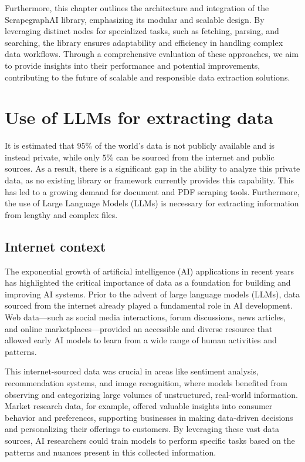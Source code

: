 Furthermore, this chapter outlines the architecture and integration of the ScrapegraphAI library, emphasizing its modular and scalable design. By leveraging distinct nodes for specialized tasks, such as fetching, parsing, and searching, the library ensures adaptability and efficiency in handling complex data workflows. Through a comprehensive evaluation of these approaches, we aim to provide insights into their performance and potential improvements, contributing to the future of scalable and responsible data extraction solutions.
\section{Use of LLMs for extracting data}
It is estimated that $95\%$ of the world's data is not publicly available and is instead private, while only $5\%$ can be sourced from the internet and public sources. As a result, there is a significant gap in the ability to analyze this private data, as no existing library or framework currently provides this capability. This has led to a growing demand for document and PDF scraping tools. Furthermore, the use of Large Language Models (LLMs) is necessary for extracting information from lengthy and complex files.

\subsection{Internet context}
The exponential growth of artificial intelligence (AI) applications in recent years has highlighted the critical importance of data as a foundation for building and improving AI systems. Prior to the advent of large language models (LLMs), data sourced from the internet already played a fundamental role in AI development. Web data—such as social media interactions, forum discussions, news articles, and online marketplaces—provided an accessible and diverse resource that allowed early AI models to learn from a wide range of human activities and patterns.

This internet-sourced data was crucial in areas like sentiment analysis, recommendation systems, and image recognition, where models benefited from observing and categorizing large volumes of unstructured, real-world information. Market research data, for example, offered valuable insights into consumer behavior and preferences, supporting businesses in making data-driven decisions and personalizing their offerings to customers. By leveraging these vast data sources, AI researchers could train models to perform specific tasks based on the patterns and nuances present in this collected information.

